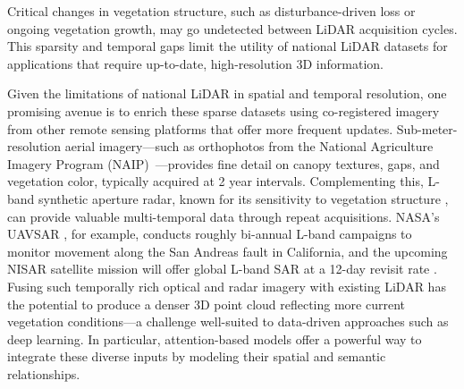 \documentclass[12pt]{report}
\begin{document}
Critical changes in vegetation structure, such as disturbance-driven loss or ongoing vegetation growth, may go undetected between LiDAR acquisition cycles. This sparsity and temporal gaps limit the utility of national LiDAR datasets for applications that require up-to-date, high-resolution 3D information.

Given the limitations of national LiDAR in spatial and temporal resolution, one promising avenue is to enrich these sparse datasets using co-registered imagery from other remote sensing platforms that offer more frequent updates. Sub-meter-resolution aerial imagery—such as orthophotos from the National Agriculture Imagery Program (NAIP)~\cite{usda_naip_2024}—provides fine detail on canopy textures, gaps, and vegetation color, typically acquired at 2 year intervals. Complementing this, L-band synthetic aperture radar, known for its sensitivity to vegetation structure \cite{wang2025interpretable}, can provide valuable multi-temporal data through repeat acquisitions. NASA’s UAVSAR \cite{rosen2006uavsar}, for example, conducts roughly bi-annual L-band campaigns to monitor movement along the San Andreas fault in California, and the upcoming NISAR satellite mission will offer global L-band SAR at a 12-day revisit rate \cite{kellogg2020nasa}. Fusing such temporally rich optical and radar imagery with existing LiDAR has the potential to produce a denser 3D point cloud reflecting more current vegetation conditions—a challenge well-suited to data-driven approaches such as deep learning. In particular, attention-based models offer a powerful way to integrate these diverse inputs by modeling their spatial and semantic relationships.
\end{document}
